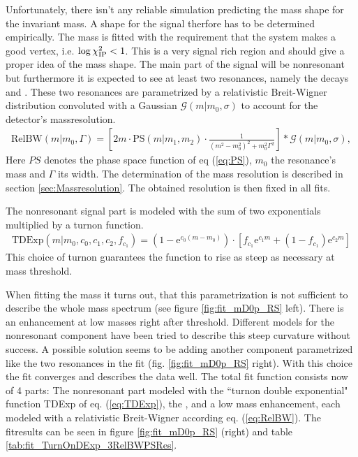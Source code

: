 Unfortunately, there isn't any reliable simulation predicting the mass shape for the \Dz\proton invariant mass. 
A shape for the signal therfore has to be determined empirically. The \Dz\proton mass is fitted with the requirement that the \Dz\proton\muon system makes a good vertex, i.e. $\log \chi^2_{\text{IP}} < 1$. 
This is a very signal rich region and should give a proper idea of the mass shape. 
The main part of the signal will be nonresonant but furthermore it is expected to see at least two resonances, namely the decays \decay{\LcResI}{\Dz\proton} and \decay{\LcResII}{\Dz\proton}.
These two resonances are parametrized by a relativistic Breit-Wigner distribution convoluted with a Gaussian $\mathcal{G}(m|m_0,\sigma)$ to account for the detector's massresolution.
\begin{align}
    \text{RelBW}(m|m_0,\Gamma) = \left[ 2m \cdot \text{PS}(m|m_1,m_2) \cdot \frac{1}{(m^2 -m_0^2)^2 + m_0^2\Gamma^2} \right] \ast \mathcal{G}(m|m_0,\sigma), \label{eq:RelBW}
\end{align}
 Here $PS$ denotes the phase space function of eq (\ref{eq:PS}), $m_0$ the resonance's mass and $\Gamma$ its width.
 The determination of the mass resolution is described in section \ref{sec:Massresolution}. 
 The obtained resolution is then fixed in all fits.

The nonresonant signal part is modeled with the sum of two exponentials multiplied by a turnon function.
\begin{align}
    \text{TDExp}(m|m_0, c_0, c_1, c_2, f_{c_1}) = \left( 1 - \mathrm{e}^{c_0(m-m_0)} \right) \cdot \left[ f_{c_1} \mathrm{e}^{c_1m} + (1-f_{c_1}) \mathrm{e}^{c_2m} \right] \label{eq:TDExp}
\end{align}
This choice of turnon guarantees the function to rise as steep as necessary at \Dz\proton mass threshold.

When fitting the \Dz\proton mass it turns out, that this parametrization is not sufficient to describe the whole mass spectrum (see figure \ref{fig:fit_mD0p_RS} left). 
There is an enhancement at low \Dz\proton masses right after threshold.
Different models for the nonresonant component have been tried to describe this steep curvature without success.
A possible solution seems to be adding another component parametrized like the two resonances in the fit (fig. \ref{fig:fit_mD0p_RS} right). 
With this choice the fit converges and describes the data well.
The total fit function consists now of 4 parts: The nonresonant part modeled with the ``turnon double exponential" function TDExp of eq. (\ref{eq:TDExp}), the \LcResI, \LcResII and a low mass enhancement, each modeled with a relativistic Breit-Wigner according eq. (\ref{eq:RelBW}). 
The fitresults can be seen in figure \ref{fig:fit_mD0p_RS} (right) and table \ref{tab:fit_TurnOnDExp_3RelBWPSRes}.

